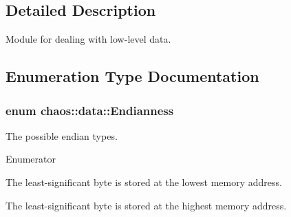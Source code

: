 \subsection{Detailed Description}
Module for dealing with low-\/level data. 

\subsection{Enumeration Type Documentation}
\hypertarget{namespacechaos_1_1data_adb2657d50c0b84cdc1153001031bbf3f}{
\subsubsection[{Endianness}]{\setlength{\rightskip}{0pt plus 5cm}enum {\bf chaos\-::data\-::\-Endianness}}}\label{namespacechaos_1_1data_adb2657d50c0b84cdc1153001031bbf3f}


The possible endian types. 

\begin{Desc}
\item[Enumerator]\par
\begin{description}
\item[{\em 
\hypertarget{namespacechaos_1_1data_adb2657d50c0b84cdc1153001031bbf3fa7fc5455bb6147c278dfa4a84e255c66d}{E\-N\-D\-I\-A\-N\-\_\-\-L\-I\-T\-T\-L\-E}\label{namespacechaos_1_1data_adb2657d50c0b84cdc1153001031bbf3fa7fc5455bb6147c278dfa4a84e255c66d}
}]The least-\/significant byte is stored at the lowest memory address. \item[{\em 
\hypertarget{namespacechaos_1_1data_adb2657d50c0b84cdc1153001031bbf3fa0e1ed99b965cedefe24534be309738ad}{E\-N\-D\-I\-A\-N\-\_\-\-B\-I\-G}\label{namespacechaos_1_1data_adb2657d50c0b84cdc1153001031bbf3fa0e1ed99b965cedefe24534be309738ad}
}]The least-\/significant byte is stored at the highest memory address. \end{description}
\end{Desc}


